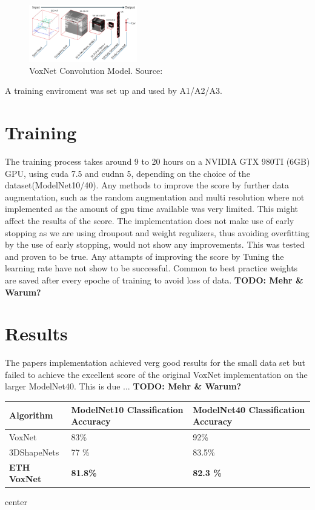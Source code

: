 \documentclass[10pt,twocolumn,letterpaper]{article}
\begin{document}
\begin{figure}[h]
	\label{fig:model}
	\centering
	\includegraphics[width=0.42\textwidth]{figures/model}
	\caption{VoxNet Convolution Model. Source: \cite{mature}}
\end{figure}

A training enviroment was set up and used by A1/A2/A3.

\section{Training}

The training process takes around 9 to 20 hours on a NVIDIA GTX 980TI (6GB) GPU, using cuda 7.5 and cudnn 5, depending on the choice of the dataset(ModelNet10/40). Any methods to improve the score by further data augmentation, such as the random augmentation and multi resolution where not implemented as the amount of gpu time available was very limited. This might affect the results of the score. 
The implementation does not make use of early stopping as we are using droupout and weight regulizers, thus avoiding overfitting by the use of early stopping, would not show any improvements. This was tested and proven to be true. Any attampts of improving the score by Tuning the learning rate have not show to be successful.
Common to best practice weights are saved after every epoche of training to avoid loss of data. \textbf{TODO: Mehr \& Warum?} \\ 

\section{Results}

The papers implementation achieved verg good results for the small data set but failed to achieve the excellent score of the 
original VoxNet implementation on the larger ModelNet40. 
This is due ... \textbf{TODO: Mehr \& Warum?} \\ 
\begin{center}
\begin{tabular}{ |p{2.3cm}||p{2.3cm}|p{2.3cm}|  }
 \hline
 Algorithm & ModelNet10 Classification Accuracy  & ModelNet40 Classification Accuracy \\
 \hline
 VoxNet \cite{voxnet}   & 83\% & 92\% \\
 3DShapeNets  \cite{shape}   & 77 \% & 83.5\% \\
\textbf{ETH VoxNet}    & \textbf{81.8\%}   & \textbf{82.3 \%}  \\
 \hline
\end{tabular}
\end{center}{center}
\end{document}
